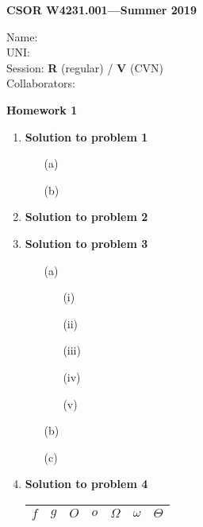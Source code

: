 \documentclass[11pt]{article}
\newcommand{\problemitem}[1]{
  \bigskip
  \item {\bf Solution to problem #1}
  \medskip
}
\begin{document}
\begin{flushright}
{\bf CSOR W4231.001---Summer 2019}
\end{flushright}
\begin{flushleft}
  Name: \\
  UNI: \\
  Session: {\bf R} (regular) / {\bf V} (CVN) \\ %
  Collaborators: \\ %
\end{flushleft}

\bigskip
\centerline{\bf Homework 1}

\begin{enumerate}

\problemitem{1}
\begin{enumerate}
  \item[(a)]

  \item[(b)]

\end{enumerate}

\problemitem{2}


\problemitem{3}
\begin{enumerate}
  \item[(a)]
    \begin{enumerate}
      \item[(i)]

      \item[(ii)]

      \item[(iii)]

      \item[(iv)]

      \item[(v)]

    \end{enumerate}
  \item[(b)]

  \item[(c)]

\end{enumerate}

\newpage
\problemitem{4}
\begin{table}[tbh]
  \centering
  \renewcommand\arraystretch{1.5}
  \begin{tabular}{|c|c|c|c|c|c|c|}\hline
  $f$                   & $g$
      & $O$       & $o$       & $\Omega$  & $\omega$  & $\Theta$  \\ \hline


\end{tabular}
\end{table}
\end{enumerate}
\end{document}
